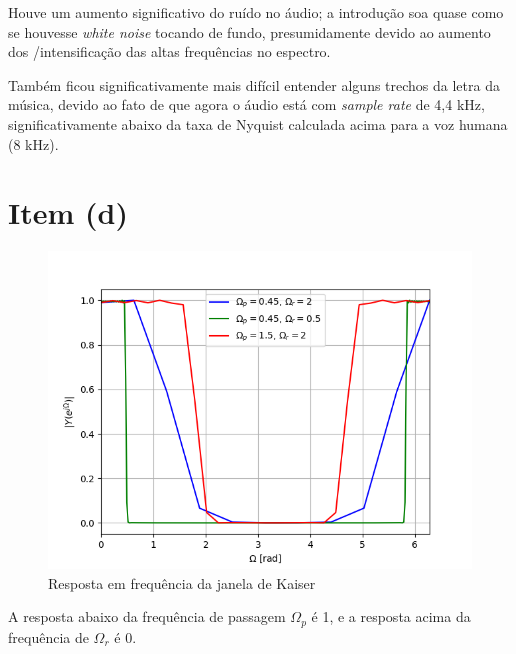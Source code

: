 \documentclass{article}
\begin{document}
Houve um aumento significativo do ruído no áudio; a introdução soa quase como se houvesse \textit{white noise} tocando de fundo, presumidamente devido ao aumento dos /intensificação das altas frequências no espectro.

Também ficou significativamente mais difícil entender alguns trechos da letra da música, devido ao fato de que agora o áudio está com \textit{sample rate} de 4,4 kHz, significativamente abaixo da taxa de Nyquist calculada acima para a voz humana (8 kHz).

\newpage

\section*{Item (d)}
\FloatBarrier
\begin{figure}[!ht]
    \centering
    \includegraphics[width=\linewidth]{images/kaiser_freq_response.png}
    \caption{Resposta em frequência da janela de Kaiser}
\end{figure}

A resposta abaixo da frequência de passagem $\Omega_p$ é 1, e a resposta acima da frequência de $\Omega_r$ é 0.

\newpage
\end{document}
